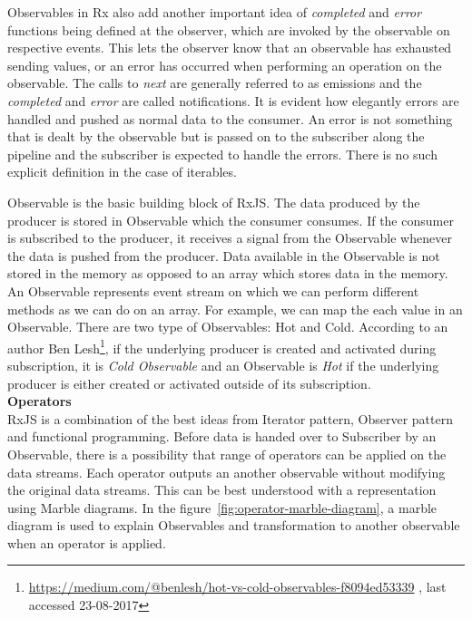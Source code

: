 Observables in Rx also add another important idea of \textit{completed} and \textit{error} functions being defined at the observer, which are invoked by the observable on respective events. This lets the observer know that an observable has exhausted sending values, or an error has occurred when performing an operation on the observable. The calls to \textit{next} are generally referred to as emissions and the \textit{completed} and \textit{error} are called notifications. It is evident how elegantly errors are handled and pushed as normal data to the consumer. An error is not something that is dealt by the observable but is passed on to the subscriber along the pipeline and the subscriber is expected to handle the errors. There is no such explicit definition in the case of iterables.  

Observable is the basic building block of RxJS. The data produced by the producer is stored in Observable which the consumer consumes. If the consumer is subscribed to the producer, it receives a signal from the Observable whenever the data is pushed from the producer. Data available in the Observable is not stored in the memory as opposed to an array which stores data in the memory. An Observable represents event stream on which we can perform different methods as we can do on an array. For example, we can map the each value in an Observable. There are two type of Observables: Hot and Cold. According to an author Ben Lesh\footnote{\url{https://medium.com/@benlesh/hot-vs-cold-observables-f8094ed53339} , last accessed 23-08-2017}, if the underlying producer is created and activated during subscription, it is \textit{Cold Observable} and an Observable is \textit{Hot} if the underlying producer is either created or activated outside of its subscription.
\\
\textbf{Operators}
\\
RxJS is a combination of the best ideas from Iterator pattern, Observer pattern and functional programming\cite{reactiveX}. Before data is handed over to Subscriber by an Observable, there is a possibility that range of operators can be applied on the data streams. Each operator outputs an another observable without modifying the original data streams. This can be best understood with a representation using Marble diagrams. In the figure~\ref{fig:operator-marble-diagram},  a marble diagram is used to explain Observables and transformation to another observable when an operator is applied. 

